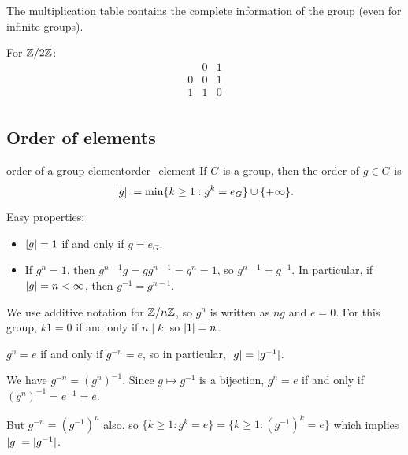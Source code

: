 \documentclass[12pt,letterpaper]{report}
\begin{document}
The multiplication table contains the complete information of the group (even for infinite groups).

\begin{ex}
  For $\mathbb{Z} / 2\mathbb{Z}$:
  \[
    \begin{array}{c|cc}
      & 0 & 1 \\
      \hline
      0 & 0 & 1 \\
      1 & 1 & 0 \\
    \end{array}
  \]
\end{ex}

\pagebreak
\subsection{Order of elements}

\begin{defn}{order of a group element}{order_element}
  If $G$ is a group, then the order of $g \in G$ is
  \[ \lvert g\rvert := \min\{ k \geq 1 : g^k = e_G \} \cup \{ +\infty \}. \]
\end{defn}

Easy properties:
\begin{itemize}
  \item $\lvert g\rvert = 1$ if and only if $g = e_G$.
  \item If $g^n = 1$, then $g^{n - 1}g = gg^{n - 1} = g^n = 1$, so $g^{n - 1} = g^{-1}$.
  In particular, if $\lvert g\rvert = n < \infty$, then $g^{-1} = g^{n - 1}$.
\end{itemize}

\begin{ex}
  We use additive notation for $\mathbb{Z}/{n}\mathbb{Z}$, so $g^n$ is written as $ng$ and $e = 0$.
  For this group, $k1 = 0$ if and only if $n \mid k$, so $\lvert1\rvert = n$.
\end{ex}

\begin{lem}{}{}
  $g^n = e$ if and only if $g^{-n} = e$, so in particular, $\lvert g\rvert = \lvert g^{-1}\rvert$.
\end{lem}

\begin{thmproof}
  We have $g^{-n} = (g^n)^{-1}$.
  Since $g \mapsto g^{-1}$ is a bijection, $g^n = e$ if and only if $(g^n)^{-1} = e^{-1} = e$.

  But $g^{-n} = (g^{-1})^n$ also, so $\{ k \geq 1 : g^k = e \} = \{ k \geq 1 : (g^{-1})^k = e \}$
  which implies $\lvert g\rvert = \lvert g^{-1}\rvert$.
\end{thmproof}
\end{document}
